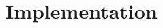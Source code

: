 \documentclass[aspectratio=43]{beamer}
\begin{document}





\section{Implementation}
\end{document}
